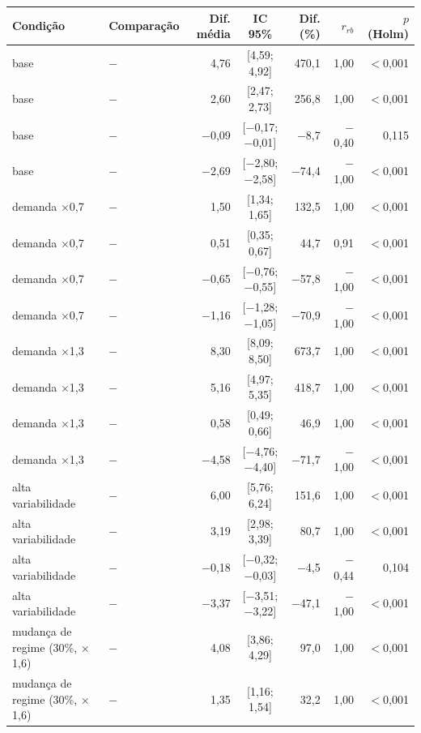 \begin{tabular}{@{}llrcrrr@{}}
\toprule
Condição & Comparação & Dif. média & IC 95\% & Dif. (\%) & $r_{rb}$ & $p$ (Holm) \\
\midrule
base & \polBOR{} $-$ \polA{} & 4,76 & [4,59; 4,92] & 470,1 & 1,00 & $<$0,001 \\
base & \polC{} $-$ \polA{} & 2,60 & [2,47; 2,73] & 256,8 & 1,00 & $<$0,001 \\
base & \polD{} $-$ \polA{} & $-$0,09 & [$-$0,17; $-$0,01] & $-$8,7 & $-$0,40 & 0,115 \\
base & \polD{} $-$ \polC{} & $-$2,69 & [$-$2,80; $-$2,58] & $-$74,4 & $-$1,00 & $<$0,001 \\
demanda $\times$0,7 & \polBOR{} $-$ \polA{} & 1,50 & [1,34; 1,65] & 132,5 & 1,00 & $<$0,001 \\
demanda $\times$0,7 & \polC{} $-$ \polA{} & 0,51 & [0,35; 0,67] & 44,7 & 0,91 & $<$0,001 \\
demanda $\times$0,7 & \polD{} $-$ \polA{} & $-$0,65 & [$-$0,76; $-$0,55] & $-$57,8 & $-$1,00 & $<$0,001 \\
demanda $\times$0,7 & \polD{} $-$ \polC{} & $-$1,16 & [$-$1,28; $-$1,05] & $-$70,9 & $-$1,00 & $<$0,001 \\
demanda $\times$1,3 & \polBOR{} $-$ \polA{} & 8,30 & [8,09; 8,50] & 673,7 & 1,00 & $<$0,001 \\
demanda $\times$1,3 & \polC{} $-$ \polA{} & 5,16 & [4,97; 5,35] & 418,7 & 1,00 & $<$0,001 \\
demanda $\times$1,3 & \polD{} $-$ \polA{} & 0,58 & [0,49; 0,66] & 46,9 & 1,00 & $<$0,001 \\
demanda $\times$1,3 & \polD{} $-$ \polC{} & $-$4,58 & [$-$4,76; $-$4,40] & $-$71,7 & $-$1,00 & $<$0,001 \\
alta variabilidade & \polBOR{} $-$ \polA{} & 6,00 & [5,76; 6,24] & 151,6 & 1,00 & $<$0,001 \\
alta variabilidade & \polC{} $-$ \polA{} & 3,19 & [2,98; 3,39] & 80,7 & 1,00 & $<$0,001 \\
alta variabilidade & \polD{} $-$ \polA{} & $-$0,18 & [$-$0,32; $-$0,03] & $-$4,5 & $-$0,44 & 0,104 \\
alta variabilidade & \polD{} $-$ \polC{} & $-$3,37 & [$-$3,51; $-$3,22] & $-$47,1 & $-$1,00 & $<$0,001 \\
mudança de regime (30\%, $\times$1,6) & \polBOR{} $-$ \polA{} & 4,08 & [3,86; 4,29] & 97,0 & 1,00 & $<$0,001 \\
mudança de regime (30\%, $\times$1,6) & \polC{} $-$ \polA{} & 1,35 & [1,16; 1,54] & 32,2 & 1,00 & $<$0,001 \\

\end{tabular}
